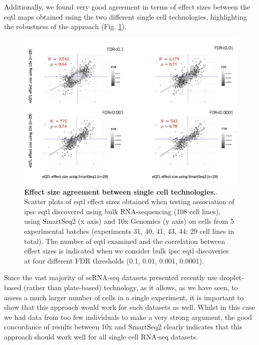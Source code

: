 \newpage

Additionally, we found very good agreement in terms of effect sizes between the \gls{eqtl} maps obtained using the two different single cell technologies, highlighting the robustness of the approach (Fig. \ref{fig:sc_eqtl_technologies}). \\

\begin{figure}[h]
\centering
\includegraphics[width=15cm]{Chapter3/Fig/beta_comparison_ss2_vs_10x.png}
\caption[iPSC sc-eQTL replication across technologies]{\textbf{Effect size agreement between single cell technologies.}.\\
Scatter plots of \gls{eqtl} effect sizes obtained when testing association of \gls{ipsc} \gls{eqtl} discovered using bulk RNA-sequencing (108 cell lines), using SmartSeq2 (x axis) and 10x Genomics (y axis) on cells from 5 experimental batches (experiments 31, 40, 41, 43, 44; 29 cell lines in total). 
The number of \gls{eqtl} examined and the correlation between effect sizes is indicated when we consider bulk \gls{ipsc} \gls{eqtl} discoveries at four different FDR thresholds (0.1, 0.01, 0.001, 0.0001).}
\label{fig:sc_eqtl_technologies}
\end{figure}

Since the vast majority of scRNA-seq datasets presented recently use droplet-based (rather than plate-based) technology, as it allows, as we have seen, to assess a much larger number of cells in a single experiment, it is important to show that this approach would work for such datasets as well. 
Whilst in this case we had data from too few individuals to make a very strong argument, the good concordance of results between 10x and SmartSeq2 clearly indicates that this approach should work well for all single cell RNA-seq datasets.

